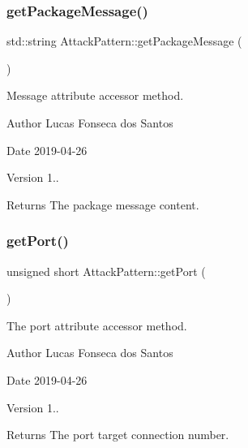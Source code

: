 \subsubsection{\texorpdfstring{get\+Package\+Message()}{getPackageMessage()}}
{\footnotesize\ttfamily std\+::string Attack\+Pattern\+::get\+Package\+Message (\begin{DoxyParamCaption}{ }\end{DoxyParamCaption})}

Message attribute accessor method. \begin{DoxyAuthor}{Author}
Lucas Fonseca dos Santos 
\end{DoxyAuthor}
\begin{DoxyDate}{Date}
2019-\/04-\/26 
\end{DoxyDate}
\begin{DoxyVersion}{Version}
1..
\end{DoxyVersion}
\begin{DoxyReturn}{Returns}
The package message content. 
\end{DoxyReturn}
\mbox{\label{classAttackPattern_a3a324cc0b946c138f5459f380fcc4aeb}} 
\subsubsection{\texorpdfstring{get\+Port()}{getPort()}}
{\footnotesize\ttfamily unsigned short Attack\+Pattern\+::get\+Port (\begin{DoxyParamCaption}{ }\end{DoxyParamCaption})}

The port attribute accessor method. \begin{DoxyAuthor}{Author}
Lucas Fonseca dos Santos 
\end{DoxyAuthor}
\begin{DoxyDate}{Date}
2019-\/04-\/26 
\end{DoxyDate}
\begin{DoxyVersion}{Version}
1..
\end{DoxyVersion}
\begin{DoxyReturn}{Returns}
The port target connection number. 
\end{DoxyReturn}
\mbox{\label{classAttackPattern_a3baba4f4f426fdfb59d0b1e4f930fc0f}} 
